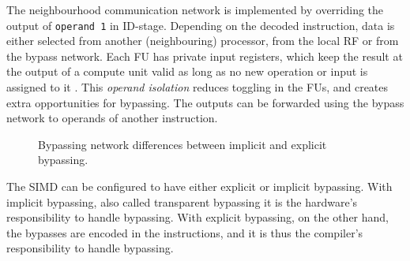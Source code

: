 The neighbourhood communication network is implemented by overriding the output of \texttt{operand 1} in ID-stage. Depending on the decoded instruction, data is either selected from another (neighbouring) processor, from the local RF or from the bypass network. Each FU has private input registers, which keep the result at the output of a compute unit valid as long as no new operation or input is assigned to it \cite{dongrio1}. This \emph{operand isolation} reduces toggling in the FUs, and creates extra opportunities for bypassing. The outputs can be forwarded using the bypass network to operands of another instruction.

\begin{figure}[b!]
\centering
{}
\hfil
{}
\caption{Bypassing network differences between implicit and explicit bypassing.}
\label{fig:datapath_approaches}
\end{figure}

The SIMD can be configured to have either explicit or implicit bypassing. With implicit bypassing, also called transparent bypassing it is the hardware's responsibility to handle bypassing. With explicit bypassing, on the other hand, the bypasses are encoded in the instructions, and it is thus the compiler's responsibility to handle bypassing.

